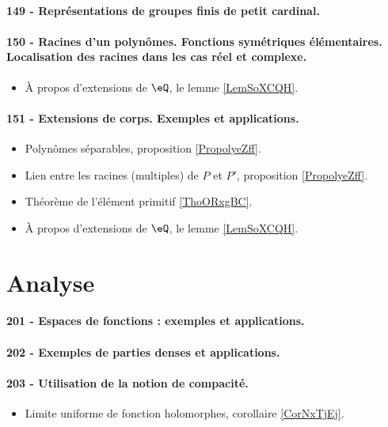\paragraph{149 - Représentations de groupes finis de petit cardinal.}
\paragraph{150 - Racines d’un polynômes. Fonctions symétriques élémentaires. Localisation des racines dans les cas réel et complexe.}
\begin{itemize}
    \item À propos d'extensions de \( \eQ\), le lemme \ref{LemSoXCQH}.
\end{itemize}
\paragraph{151 - Extensions de corps. Exemples et applications.}
\begin{itemize}
    \item Polynômes séparables, proposition \ref{PropolyeZff}.
    \item Lien entre les racines (multiples) de \( P\) et \( P'\), proposition \ref{PropolyeZff}.
    \item Théorème de l'élément primitif \ref{ThoORxgBC}.
    \item À propos d'extensions de \( \eQ\), le lemme \ref{LemSoXCQH}.
\end{itemize}

\section{Analyse}

\paragraph{201 - Espaces de fonctions : exemples et applications.}
\paragraph{202 - Exemples de parties denses et applications.}
\paragraph{203 - Utilisation de la notion de compacité.}
\begin{itemize}
    \item Limite uniforme de fonction holomorphes, corollaire \ref{CorNxTjEj}.
\end{itemize}

